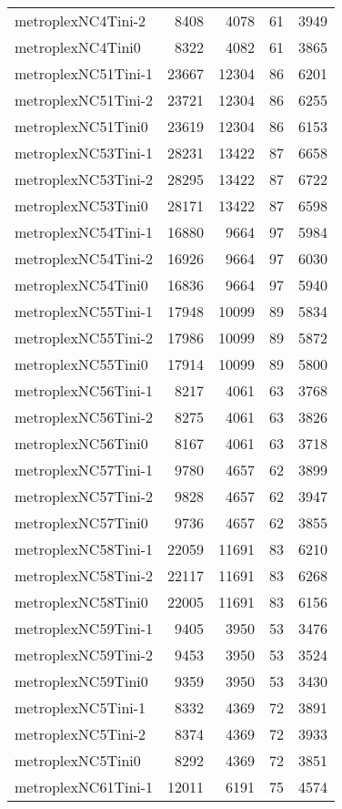 \begin{longtable}{lrrrr}
metroplexNC4Tini-2 & 8408 & 4078 & 61 & 3949 \\
metroplexNC4Tini0 & 8322 & 4082 & 61 & 3865 \\
metroplexNC51Tini-1 & 23667 & 12304 & 86 & 6201 \\
metroplexNC51Tini-2 & 23721 & 12304 & 86 & 6255 \\
metroplexNC51Tini0 & 23619 & 12304 & 86 & 6153 \\
metroplexNC53Tini-1 & 28231 & 13422 & 87 & 6658 \\
metroplexNC53Tini-2 & 28295 & 13422 & 87 & 6722 \\
metroplexNC53Tini0 & 28171 & 13422 & 87 & 6598 \\
metroplexNC54Tini-1 & 16880 & 9664 & 97 & 5984 \\
metroplexNC54Tini-2 & 16926 & 9664 & 97 & 6030 \\
metroplexNC54Tini0 & 16836 & 9664 & 97 & 5940 \\
metroplexNC55Tini-1 & 17948 & 10099 & 89 & 5834 \\
metroplexNC55Tini-2 & 17986 & 10099 & 89 & 5872 \\
metroplexNC55Tini0 & 17914 & 10099 & 89 & 5800 \\
metroplexNC56Tini-1 & 8217 & 4061 & 63 & 3768 \\
metroplexNC56Tini-2 & 8275 & 4061 & 63 & 3826 \\
metroplexNC56Tini0 & 8167 & 4061 & 63 & 3718 \\
metroplexNC57Tini-1 & 9780 & 4657 & 62 & 3899 \\
metroplexNC57Tini-2 & 9828 & 4657 & 62 & 3947 \\
metroplexNC57Tini0 & 9736 & 4657 & 62 & 3855 \\
metroplexNC58Tini-1 & 22059 & 11691 & 83 & 6210 \\
metroplexNC58Tini-2 & 22117 & 11691 & 83 & 6268 \\
metroplexNC58Tini0 & 22005 & 11691 & 83 & 6156 \\
metroplexNC59Tini-1 & 9405 & 3950 & 53 & 3476 \\
metroplexNC59Tini-2 & 9453 & 3950 & 53 & 3524 \\
metroplexNC59Tini0 & 9359 & 3950 & 53 & 3430 \\
metroplexNC5Tini-1 & 8332 & 4369 & 72 & 3891 \\
metroplexNC5Tini-2 & 8374 & 4369 & 72 & 3933 \\
metroplexNC5Tini0 & 8292 & 4369 & 72 & 3851 \\
metroplexNC61Tini-1 & 12011 & 6191 & 75 & 4574 \\

\end{longtable}
